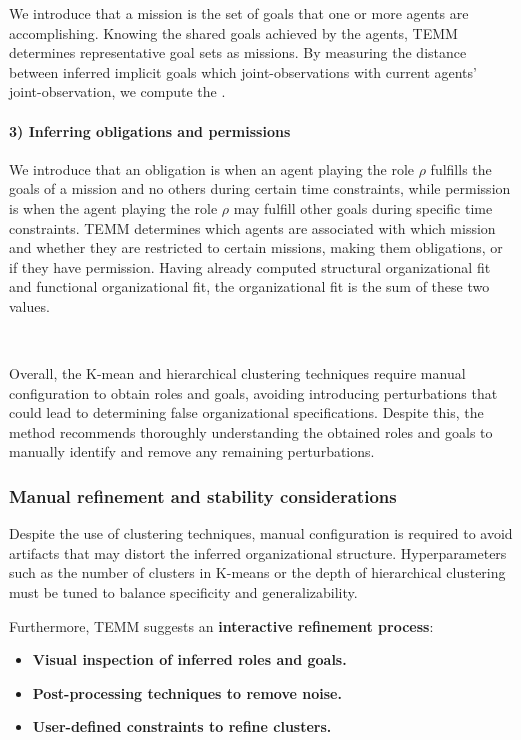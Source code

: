 \documentclass[pdflatex,sn-mathphys-num]{sn-jnl}%
\theoremstyle{thmstyleone}%
\theoremstyle{thmstyletwo}%
\theoremstyle{thmstylethree}%
\begin{document}
We introduce that a mission is the set of goals that one or more agents are accomplishing.
Knowing the shared goals achieved by the agents, TEMM determines representative goal sets as missions.
By measuring the distance between inferred implicit goals which joint-observations with current agents' joint-observation, we compute the .

\paragraph{3) Inferring obligations and permissions}

We introduce that an obligation is when an agent playing the role $\rho$ fulfills the goals of a mission and no others during certain time constraints, while permission is when the agent playing the role $\rho$ may fulfill other goals during specific time constraints.
TEMM determines which agents are associated with which mission and whether they are restricted to certain missions, making them obligations, or if they have permission.
Having already computed structural organizational fit and functional organizational fit, the organizational fit is the sum of these two values.

\

Overall, the K-mean and hierarchical clustering techniques require manual configuration to obtain roles and goals, avoiding introducing perturbations that could lead to determining false organizational specifications. Despite this, the method recommends thoroughly understanding the obtained roles and goals to manually identify and remove any remaining perturbations.

\subsubsection{Manual refinement and stability considerations}

Despite the use of clustering techniques, manual configuration is required to avoid artifacts that may distort the inferred organizational structure. Hyperparameters such as the number of clusters in K-means or the depth of hierarchical clustering must be tuned to balance specificity and generalizability.

Furthermore, TEMM suggests an \textbf{interactive refinement process}:
\begin{itemize}
    \item \textbf{Visual inspection of inferred roles and goals.}
    \item \textbf{Post-processing techniques to remove noise.}
    \item \textbf{User-defined constraints to refine clusters.}
\end{itemize}
\end{document}
